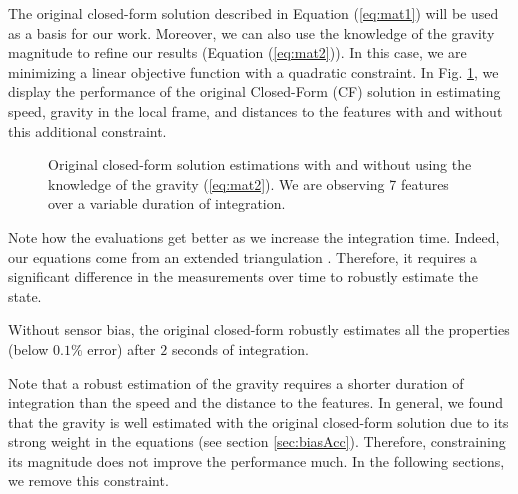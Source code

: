 \documentclass[letterpaper, 10 pt, conference]{ieeeconf}  %
\begin{document}
The original closed-form solution described in Equation (\ref{eq:mat1}) will be used as a basis for our work.
Moreover, we can also use the knowledge of the gravity magnitude to refine our results (Equation (\ref{eq:mat2})).
In this case, we are minimizing a linear objective function with a quadratic constraint.
In Fig. \ref{fig:original}, we display the performance of the original Closed-Form (CF) solution in estimating speed, gravity in the local frame, and distances to the features with and without this additional constraint.

\begin{figure}
  \centering
    \resizebox{0.7\columnwidth}{!}{}
    \caption{Original closed-form solution estimations with and without using the knowledge of the gravity (\ref{eq:mat2}). We are observing 7 features  over a variable duration of integration.\label{fig:original}}
\end{figure}

Note how the evaluations get better as we increase the integration time.
Indeed, our equations come from an extended triangulation \cite{Martinelli2012}.
Therefore, it requires a significant difference in the measurements over time to robustly estimate the state.


Without sensor bias, the original closed-form robustly estimates all the properties (below $0.1\%$ error) after $2$ seconds of integration.

Note that a robust estimation of the gravity requires a shorter duration of integration than the speed and the distance to the features.
In general, we found that the gravity is well estimated with the original closed-form solution due to its strong weight in the equations (see section \ref{sec:biasAcc}).
Therefore, constraining its magnitude does not improve the performance much.
In the following sections, we remove this constraint.
\end{document}

